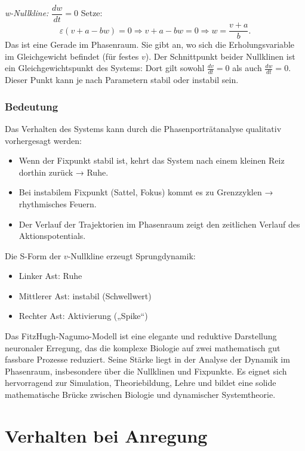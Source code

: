 \begin{refsection}
\emph{w-Nullkline:} $\dfrac{dw}{dt} = 0$
\noindent
Setze:
\[
\varepsilon (v + a - b w) = 0 \Rightarrow v + a - b w = 0 \Rightarrow w = \frac{v + a}{b}.
\]
Das ist eine Gerade im Phasenraum.  
Sie gibt an, wo sich die Erholungsvariable im Gleichgewicht befindet (für festes $v$).
Der Schnittpunkt beider Nullklinen ist ein Gleichgewichtspunkt des Systems: Dort gilt sowohl $\frac{dv}{dt} = 0$ als
auch $\frac{dw}{dt} = 0$. Dieser Punkt kann je nach Parametern stabil oder instabil sein.
\subsubsection{Bedeutung}
Das Verhalten des Systems kann durch die Phasenporträtanalyse qualitativ vorhergesagt werden:
\begin{itemize}
	\item Wenn der Fixpunkt stabil ist, kehrt das System nach einem kleinen Reiz dorthin zurück → Ruhe.
	\item Bei instabilem Fixpunkt (Sattel, Fokus) kommt es zu Grenzzyklen → rhythmisches Feuern.
	\item Der Verlauf der Trajektorien im Phasenraum zeigt den zeitlichen Verlauf des Aktionspotentials.
\end{itemize}
Die S-Form der $v$-Nullkline erzeugt Sprungdynamik:
\begin{itemize}
	\item Linker Ast: Ruhe
	\item Mittlerer Ast: instabil (Schwellwert)
	\item Rechter Ast: Aktivierung („Spike“)
\end{itemize}
Das FitzHugh-Nagumo-Modell ist eine elegante und reduktive Darstellung neuronaler Erregung, das die komplexe Biologie auf zwei mathematisch gut fassbare Prozesse reduziert. Seine Stärke liegt in der Analyse der Dynamik im Phasenraum, insbesondere über die Nullklinen und Fixpunkte. Es eignet sich hervorragend zur Simulation, Theoriebildung, Lehre und bildet eine solide mathematische Brücke zwischen Biologie und dynamischer Systemtheorie.

\section{Verhalten bei Anregung}

\end{refsection}
